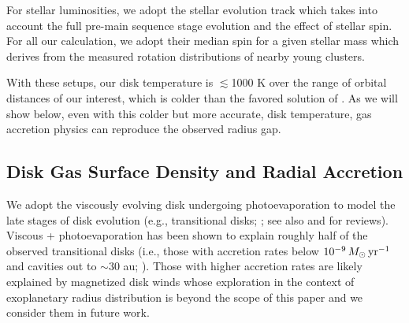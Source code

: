 \documentclass[twocolumn]{aastex631}
\begin{document}
For stellar luminosities, we adopt the \citet{Johnstone21} stellar evolution track which takes into account the full pre-main sequence stage evolution and the effect of stellar spin. For all our calculation, we adopt their median spin for a given stellar mass which derives from the measured rotation distributions of nearby young clusters. 

With these setups, our disk temperature is $\lesssim$1000 K over the range of orbital distances of our interest, which is colder than the favored solution of \citet{Lee21}. As we will show below, even with this colder but more accurate, disk temperature, gas accretion physics can reproduce the observed radius gap.

\subsection{Disk Gas Surface Density and Radial Accretion}
\label{ssec:gas_sdens}

We adopt the viscously evolving disk undergoing photoevaporation to model the late stages of disk evolution (e.g., transitional disks; \citealt{Owen11}; see also \citealt{Alexander14} and \citealt{Pascucci22} for reviews). Viscous + photoevaporation has been shown to explain roughly half of the observed transitional disks (i.e., those with accretion rates below $10^{-9}\,M_\odot\,{\rm yr}^{-1}$ and cavities out to $\sim$30 au; \citealt{Picogna19}). Those with higher accretion rates are likely explained by magnetized disk winds \citep[e.g.,][]{Suzuki16,Wang17} whose exploration in the context of exoplanetary radius distribution is beyond the scope of this paper and we consider them in future work.
\end{document}
